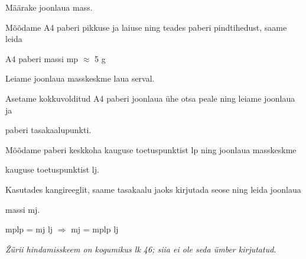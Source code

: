 
Määrake joonlaua mass.

\hint

\solu
Mõõdame A4 paberi pikkuse ja laiuse ning teades paberi pindtihedust, saame leida

A4 paberi massi mp $\approx$ 5 g

Leiame joonlaua masskeskme laua serval.

Asetame kokkuvolditud A4 paberi joonlaua ühe otsa peale ning leiame joonlaua ja

paberi tasakaalupunkti.

Mõõdame paberi keskkoha kauguse toetuspunktist lp ning joonlaua masskeskme

kauguse toetuspunktist lj.

Kasutades kangireeglit, saame tasakaalu jaoks kirjutada seose ning leida joonlaua

massi mj.

mplp = mj lj $\Rightarrow$ mj = mplp lj

\textit{Žürii hindamisskeem on kogumikus lk 46; siia ei ole seda ümber kirjutatud.}
\probend
